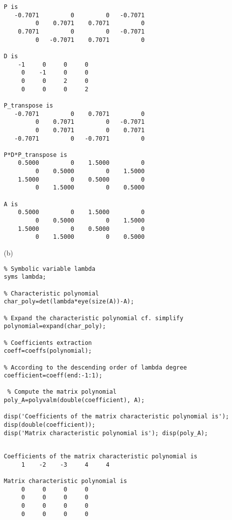\begin{exer}
\begin{sol}
\begin{enumerate}
\begin{outputs}
\begin{verbatim}
P is
   -0.7071         0         0   -0.7071
         0    0.7071    0.7071         0
    0.7071         0         0   -0.7071
         0   -0.7071    0.7071         0

D is
    -1     0     0     0
     0    -1     0     0
     0     0     2     0
     0     0     0     2

P_transpose is
   -0.7071         0    0.7071         0
         0    0.7071         0   -0.7071
         0    0.7071         0    0.7071
   -0.7071         0   -0.7071         0

P*D*P_transpose is
    0.5000         0    1.5000         0
         0    0.5000         0    1.5000
    1.5000         0    0.5000         0
         0    1.5000         0    0.5000

A is
    0.5000         0    1.5000         0
         0    0.5000         0    1.5000
    1.5000         0    0.5000         0
         0    1.5000         0    0.5000
\end{verbatim}

\end{outputs}


\item[(b)]
\begin{verbatim}
% Symbolic variable lambda
syms lambda;    

% Characteristic polynomial
char_poly=det(lambda*eye(size(A))-A); 

% Expand the characteristic polynomial cf. simplify
polynomial=expand(char_poly);   

% Coefficients extraction
coeff=coeffs(polynomial); 

% According to the descending order of lambda degree
coefficient=coeff(end:-1:1); 

 % Compute the matrix polynomial
poly_A=polyvalm(double(coefficient), A);

disp('Coefficients of the matrix characteristic polynomial is');
disp(double(coefficient));
disp('Matrix characteristic polynomial is'); disp(poly_A);
\end{verbatim}



\begin{outputs}

\begin{verbatim}

Coefficients of the matrix characteristic polynomial is
     1    -2    -3     4     4

Matrix characteristic polynomial is
     0     0     0     0
     0     0     0     0
     0     0     0     0
     0     0     0     0
\end{verbatim}
\end{outputs}


\end{enumerate}
\end{sol}
\end{exer}
